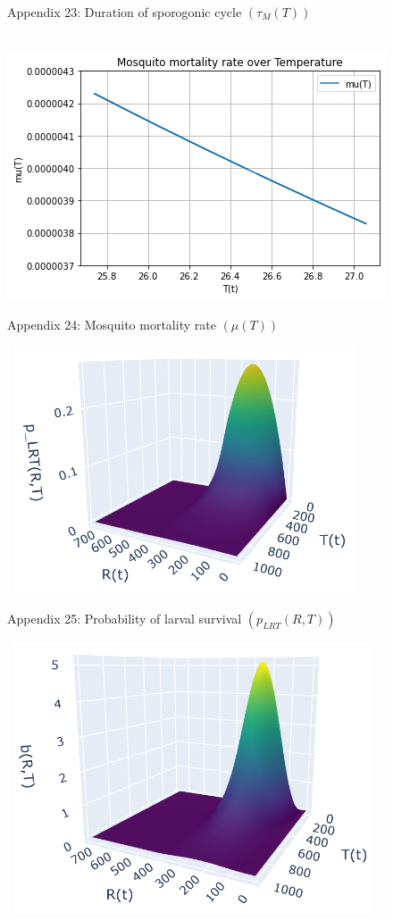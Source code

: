 \documentclass[
	12pt,				%
	oneside,			%
	a4paper,			%
	english,			%
	brazil				%
	]{abntex2}
\begin{document}
\begin{apendicesenv}
\begin{figure}[!ht]
	\caption*{Appendix 23: Duration of sporogonic cycle $(\tau_M(T))$}
\end{figure} 
\begin{figure}[!ht]
	\centering
	\hbox{\hspace{2.0em} \includegraphics[scale=0.8] {THESIS-Plot_mu(T).png}}
	\caption*{Appendix 24: Mosquito mortality rate $(\mu(T))$}
\end{figure}
\newpage
\begin{figure}[!ht]
	\centering
	\hbox{\hspace{4.0em} \includegraphics[scale=1.2] {THESIS-Plot_p_LRT(R_T).png}}
	\caption*{Appendix 25: Probability of larval survival $(p_{LRT}(R,T))$}
\end{figure} 
\begin{figure}[!ht]
	\centering
	\hbox{\hspace{4.0em} \includegraphics[scale=1.2] {THESIS-Plot_b(R_T).png}}

\end{figure}
\end{apendicesenv}
\end{document}
